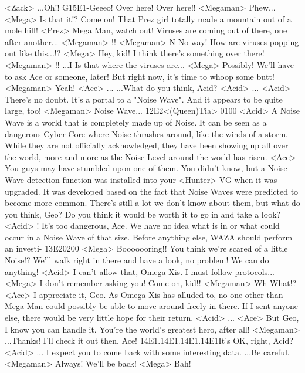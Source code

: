 <Zack> ...Oh!! 
G{15}{E1}-Geeeo! 
Over here! Over here!! 
<Megaman> Phew... 
<Mega> Is that it!? Come on! 
That Prez girl totally made a mountain out of a mole hill! 
<Prez> Mega Man, watch out! 
Viruses are coming out of there, one after another... 
<Megaman> !! 
<Megaman> N-No way! 
How are viruses popping out like this...!? 
<Mega> Hey, kid! I think there's something over there! 
<Megaman> !! 
...I-Is that where the viruses are... 
<Mega> Possibly! We'll have to ask Ace or someone, later! 
But right now, it's time to whoop some butt! 
<Megaman> Yeah! 
<Ace> ... 
...What do you think, Acid? 
<Acid> ... 
<Acid> There's no doubt. 
It's a portal to a "Noise Wave". 
And it appears to be quite large, too! 
<Megaman> Noise Wave... 
{12}{E2}<(Queen)Tia> {01}{00} 
<Acid> A Noise Wave is a world that is completely made up of Noise. 
It can be seen as a dangerous Cyber Core where 
Noise thrashes around, like the winds of a storm. 
While they are not officially acknowledged, they have been showing up all over the 
world, more and more as the Noise Level around the world has risen. 
<Ace> You guys may have stumbled upon one of them. 
You didn't know, but a Noise Wave detection function was 
installed into your <Hunter>-VG when it was upgraded. 
It was developed based on the fact that Noise Waves 
were predicted to become more common. 
There's still a lot we don't know about them, but what do you think, Geo? 
Do you think it would be worth it to go in and take a look? 
<Acid> ! 
It's too dangerous, Ace. 
We have no idea what is in or what could occur in a Noise Wave of that size. 
Before anything else, WAZA should perform an investi- 
{13}{E2}{02}{00} 
<Mega> Booooooring!! 
You think we're scared of a little Noise!? 
We'll walk right in there and have a look, no problem! We can do anything! 
<Acid> I can't allow that, Omega-Xis. 
I must follow protocols... 
<Mega> I don't remember asking you! Come on, kid!! 
<Megaman> Wh-What!? 
<Ace> I appreciate it, Geo. 
As Omega-Xis has alluded to, no one other than Mega Man 
could possibly be able to move around freely in there. 
If I sent anyone else, there would be very little hope for their return. 
<Acid> ... 
<Ace> But Geo, I know you can handle it. 
You're the world's greatest hero, after all! 
<Megaman> ...Thanks! 
I'll check it out then, Ace! 
{14}{E1}.{14}{E1}.{14}{E1}.{14}{E1}It's OK, right, Acid? 
<Acid> ... 
I expect you to come back with some interesting data. 
...Be careful. 
<Megaman> Always! We'll be back! 
<Mega> Bah! 
